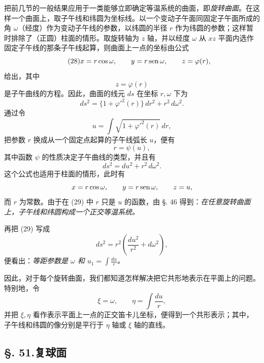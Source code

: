 把前几节的一般结果应用于一类能够立即确定等温系统的曲面，即\emph{旋转曲面}。在这样一个曲面上，取子午线和纬圆为坐标线。以一个变动子午面同固定子午面所成的角 \(\omega\)（经度）作为变动子午线的参数，以纬圆的半径 \(r\) 作为纬圆的参数；这样暂时排除了（正圆）柱面的情形。取旋转轴为 \(z\) 轴，并以经度 \(\omega\) 从 \(xz\) 平面内选作固定子午线的那条子午线起算，则曲面上一点的坐标由公式
\begin{equation}\tag{28}
 x=r\cos\omega,
 \qquad
 y=r\operatorname{sen}\omega,
 \qquad
 z=\varphi(r),
\end{equation}
给出，其中
\[
 z=\varphi(r)
\]
是子午曲线的方程。因此，曲面的线元 \(ds\) 在坐标 \(r,\omega\) 下为
\[
 ds^2=\{1+\varphi'^2(r)\}\,dr^2+r^2\,d\omega^2.
\]
通过令
\[
 u=\int\sqrt{1+\varphi'^2(r)}\,dr,
\]
把参数 \(r\) 换成从一个固定点起算的子午线弧长 \(u\)，便有
\[
 r=\psi(u),
\]
其中函数 \(\psi\) 的性质决定子午曲线的类型，并且有
\begin{equation}\tag{29}
 ds^2=du^2+r^2\,d\omega^2.
\end{equation}
这个公式也适用于柱面的情形，此时有
\[
 x=r\cos\omega,
 \qquad
 y=r\operatorname{sen}\omega,
 \qquad
 z=u,
\]
而 \(r\) 为常数。由于在 (29) 中 \(r\) 只是 \(u\) 的函数，由 \S. 46 得到：\emph{在任意旋转曲面上，子午线和纬圆构成一个正交等温系统。}

再把 (29) 写成
\[
 ds^2=r^2\left(\frac{du^2}{r^2}+d\omega^2\right),
\]
便看出：\emph{等距参数是 \(\omega\) 和 \(u_1=\displaystyle\int\frac{du}{r}\)。}

因此，对于每个旋转曲面，我们都知道怎样解决把它共形地表示在平面上的问题。特别地，令
\[
 \xi=\omega,
 \qquad
 \eta=\int\frac{du}{r},
\]
并把 \(\xi,\eta\) 看作表示平面上一点的正交笛卡儿坐标，便得到一个共形表示；其中，子午线和纬圆的像分别是平行于 \(\eta\) 轴或 \(\xi\) 轴的直线。

\subsection*{\S. 51.\quad 复球面}

